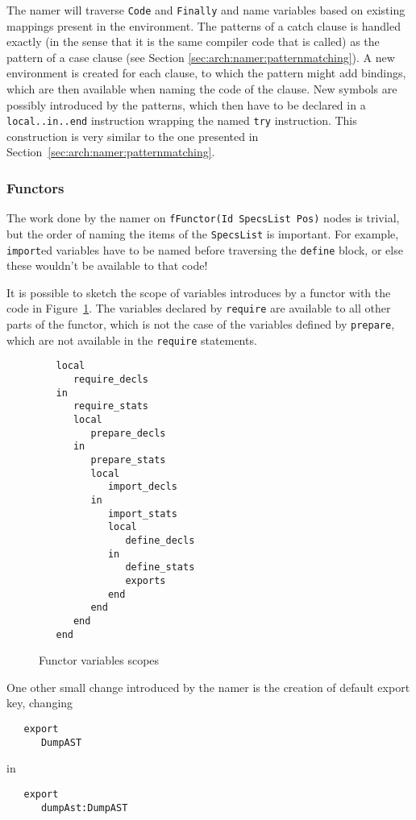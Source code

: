 \documentclass[a4paper]{memoir}
\begin{document}
The namer will traverse \lstinline!Code! and \lstinline!Finally! and name variables based on existing
mappings present in the environment. The patterns of a catch clause is
handled exactly (in the sense that it is the same compiler code that is called)
as the pattern of a case clause (see Section \ref{sec:arch:namer:patternmatching}).
A new environment is created for each clause, to which the pattern might add
bindings, which are then available when naming the code of the clause.
New symbols are possibly introduced by the patterns, which then have to be
declared in a \lstinline!local..in..end! instruction wrapping the named
\lstinline!try!  instruction. This construction is very similar to the one
presented in Section~\ref{sec:arch:namer:patternmatching}.

\subsubsection{Functors}\label{sec:arch:namer:functors}
The work done by the namer on \lstinline!fFunctor(Id SpecsList Pos)! nodes is trivial, but the
order of naming the items of the \lstinline!SpecsList! is important. For
example, \lstinline!import!ed variables have to be named before traversing the
\lstinline!define! block, or else these wouldn't be available to that code!

It is possible to sketch the scope of variables introduces by a functor with the code in
Figure~\ref{fig:functors_scope}. The variables declared by \lstinline!require!
are available to all other parts of the functor, which is not the case of the
variables defined by \lstinline!prepare!, which are not available in the
\lstinline!require! statements. 

\begin{figure}[ht]
\begin{lstlisting}
   local
      require_decls
   in
      require_stats
      local
         prepare_decls
      in
         prepare_stats
         local
            import_decls
         in
            import_stats
            local
               define_decls
            in
               define_stats
               exports
            end
         end
      end
   end
\end{lstlisting}
\caption{Functor variables scopes}
\label{fig:functors_scope}
\end{figure}

One other small change introduced by the namer is the creation of default export
key, changing
\begin{lstlisting}
   export
      DumpAST
\end{lstlisting}
in
\begin{lstlisting}
   export
      dumpAst:DumpAST
\end{lstlisting}
\end{document}
